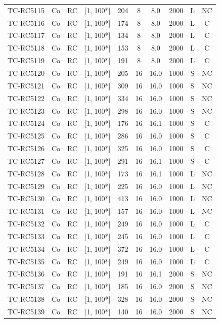\begin{longtable}{lccccccccc}
TC-RC5115 & Co & RC & [1, 100*] & 204 & 8 & 8.0 & 2000 & L & NC \\
TC-RC5116 & Co & RC & [1, 100*] & 174 & 8 & 8.0 & 2000 & L & C \\
TC-RC5117 & Co & RC & [1, 100*] & 134 & 8 & 8.0 & 2000 & L & C \\
TC-RC5118 & Co & RC & [1, 100*] & 153 & 8 & 8.0 & 2000 & L & C \\
TC-RC5119 & Co & RC & [1, 100*] & 191 & 8 & 8.0 & 2000 & L & C \\
TC-RC5120 & Co & RC & [1, 100*] & 205 & 16 & 16.0 & 1000 & S & NC \\
TC-RC5121 & Co & RC & [1, 100*] & 309 & 16 & 16.0 & 1000 & S & NC \\
TC-RC5122 & Co & RC & [1, 100*] & 334 & 16 & 16.0 & 1000 & S & NC \\
TC-RC5123 & Co & RC & [1, 100*] & 298 & 16 & 16.0 & 1000 & S & NC \\
TC-RC5124 & Co & RC & [1, 100*] & 176 & 16 & 16.1 & 1000 & S & C \\
TC-RC5125 & Co & RC & [1, 100*] & 286 & 16 & 16.0 & 1000 & S & C \\
TC-RC5126 & Co & RC & [1, 100*] & 325 & 16 & 16.0 & 1000 & S & C \\
TC-RC5127 & Co & RC & [1, 100*] & 291 & 16 & 16.1 & 1000 & S & C \\
TC-RC5128 & Co & RC & [1, 100*] & 173 & 16 & 16.1 & 1000 & L & NC \\
TC-RC5129 & Co & RC & [1, 100*] & 225 & 16 & 16.0 & 1000 & L & NC \\
TC-RC5130 & Co & RC & [1, 100*] & 413 & 16 & 16.0 & 1000 & L & NC \\
TC-RC5131 & Co & RC & [1, 100*] & 157 & 16 & 16.0 & 1000 & L & NC \\
TC-RC5132 & Co & RC & [1, 100*] & 249 & 16 & 16.0 & 1000 & L & C \\
TC-RC5133 & Co & RC & [1, 100*] & 245 & 16 & 16.0 & 1000 & L & C \\
TC-RC5134 & Co & RC & [1, 100*] & 372 & 16 & 16.0 & 1000 & L & C \\
TC-RC5135 & Co & RC & [1, 100*] & 249 & 16 & 16.0 & 1000 & L & C \\
TC-RC5136 & Co & RC & [1, 100*] & 191 & 16 & 16.1 & 2000 & S & NC \\
TC-RC5137 & Co & RC & [1, 100*] & 185 & 16 & 16.0 & 2000 & S & NC \\
TC-RC5138 & Co & RC & [1, 100*] & 328 & 16 & 16.0 & 2000 & S & NC \\
TC-RC5139 & Co & RC & [1, 100*] & 140 & 16 & 16.0 & 2000 & S & NC \\

\end{longtable}
